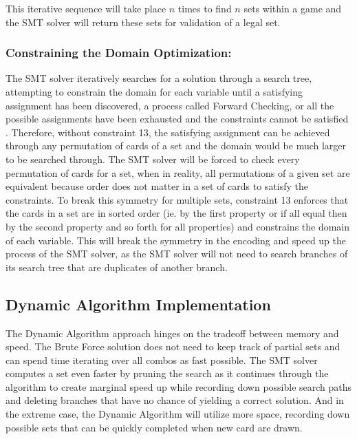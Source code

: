 \documentclass[pageno]{jpaper}
\begin{document}
This iterative sequence will take place $n$ times to find $n$ sets within a game and the SMT solver will return these sets for validation of a legal set. 

\subsubsection{Constraining the Domain Optimization:}

The SMT solver iteratively searches for a solution through a search tree, attempting to constrain the domain for each variable until a satisfying assignment has been discovered, a process called Forward Checking, or all the possible assignments have been exhausted and the constraints cannot be satisfied  \cite{search_from_AI}. Therefore, without constraint 13, the satisfying assignment can be achieved through any permutation of cards of a set and the domain would be much larger to be searched through. The SMT solver will be forced to check every permutation of cards for a set, when in reality, all permutations of a given set are equivalent because order does not matter in a set of cards to satisfy the constraints. To break this symmetry for multiple sets, constraint 13 enforces that the cards in a set are in sorted order (ie. by the first property or if all equal then by the second property and so forth for all properties) and constrains the domain of each variable. This will break the symmetry in the encoding and speed up the process of the SMT solver, as the SMT solver will not need to search branches of its search tree that are duplicates of another branch. 

\subsection{Dynamic Algorithm Implementation}

The Dynamic Algorithm approach hinges on the tradeoff between memory and speed. The Brute Force solution does not need to keep track of partial sets and can spend time iterating over all combos as fast possible. The SMT solver computes a set even faster by pruning the search as it continues through the algorithm to create marginal speed up while recording down possible search paths and deleting branches that have no chance of yielding a correct solution. And in the extreme case, the Dynamic Algorithm will utilize more space, recording down possible sets that can be quickly completed when new card are drawn. 
\end{document}
